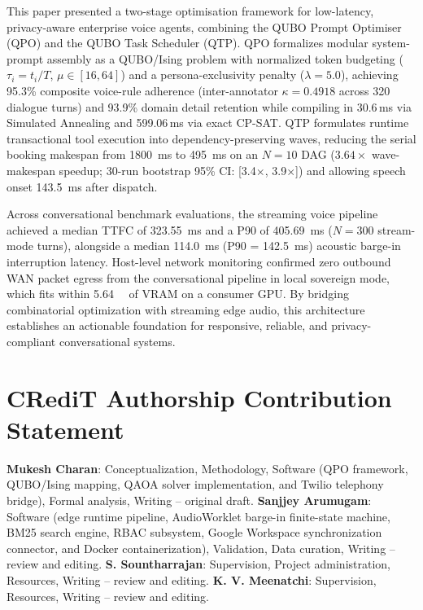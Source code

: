 \documentclass[review,12pt,times,authoryear]{elsarticle}
\theoremstyle{definition}
\begin{document}
This paper presented a two-stage optimisation framework for low-latency, privacy-aware enterprise voice agents, combining the QUBO Prompt Optimiser (QPO) and the QUBO Task Scheduler (QTP). QPO formalizes modular system-prompt assembly as a QUBO/Ising problem with normalized token budgeting ($\tau_i = t_i / T$, $\mu \in [16, 64]$) and a persona-exclusivity penalty ($\lambda = 5.0$), achieving 95.3\% composite voice-rule adherence (inter-annotator $\kappa = 0.4918$ across 320 dialogue turns) and 93.9\% domain detail retention while compiling in 30.6\,ms via Simulated Annealing and 599.06\,ms via exact CP-SAT. QTP formulates runtime transactional tool execution into dependency-preserving waves, reducing the serial booking makespan from \SI{1800}{\milli\second} to \SI{495}{\milli\second} on an $N=10$ DAG ($3.64\times$ wave-makespan speedup; 30-run bootstrap 95\% CI: [3.4$\times$, 3.9$\times$]) and allowing speech onset \SI{143.5}{\milli\second} after dispatch. 

Across conversational benchmark evaluations, the streaming voice pipeline achieved a median TTFC of \SI{323.55}{\milli\second} and a P90 of \SI{405.69}{\milli\second} ($N=300$ stream-mode turns), alongside a median \SI{114.0}{\milli\second} (P90 = \SI{142.5}{\milli\second}) acoustic barge-in interruption latency. Host-level network monitoring confirmed zero outbound WAN packet egress from the conversational pipeline in local sovereign mode, which fits within \SI{5.64}{\giga\byte} of VRAM on a consumer GPU. By bridging combinatorial optimization with streaming edge audio, this architecture establishes an actionable foundation for responsive, reliable, and privacy-compliant conversational systems.

\section*{CRediT Authorship Contribution Statement}
\textbf{Mukesh Charan}: Conceptualization, Methodology, Software (QPO framework, QUBO/Ising mapping, QAOA solver implementation, and Twilio telephony bridge), Formal analysis, Writing -- original draft.
\textbf{Sanjjey Arumugam}: Software (edge runtime pipeline, AudioWorklet barge-in finite-state machine, BM25 search engine, RBAC subsystem, Google Workspace synchronization connector, and Docker containerization), Validation, Data curation, Writing -- review and editing.
\textbf{S. Sountharrajan}: Supervision, Project administration, Resources, Writing -- review and editing.
\textbf{K. V. Meenatchi}: Supervision, Resources, Writing -- review and editing.
\end{document}

